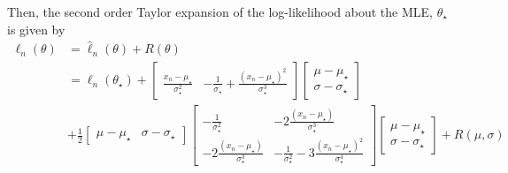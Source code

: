 Then, the second order Taylor expansion of the log-likelihood about the MLE, $\theta_{\star}$ is given by 
\begin{equation}
\begin{split}{}
      \ell_n\left(\theta\right) &= \hat{\ell}_n(\theta) + R(\theta) \\ & = \ell_n\left(\theta_{\star}\right) + \begin{bmatrix} \frac{x_n - \mu_{\star}}{\sigma_{\star}^2}&
-\frac{1}{\sigma_{\star}} + \frac{\left(x_n - \mu_{\star}\right)^2}{\sigma_{\star}^3}\end{bmatrix} \begin{bmatrix} \mu - \mu_{\star} \\   \sigma - \sigma_{\star} \end{bmatrix} \\ &+ \frac{1}{2} \begin{bmatrix} \mu - \mu_{\star} & \sigma - \sigma_{\star} \end{bmatrix} \begin{bmatrix}- \frac{1}{\sigma_{\star}^2} & - 2\frac{\left(x_n - \mu_{\star}\right)}{\sigma_{\star}^3} \\ -2\frac{\left(x_n - \mu_{\star}\right)}{\sigma_{\star}^3} & - \frac{1}{\sigma_{\star}^2} - 3\frac{\left(x_n - \mu_{\star}\right)^2}{\sigma_{\star}^4}\end{bmatrix} \begin{bmatrix} \mu - \mu_{\star} \\   \sigma - \sigma_{\star} \end{bmatrix}   + R(\mu, \sigma)
\end{split}
\end{equation}
 
